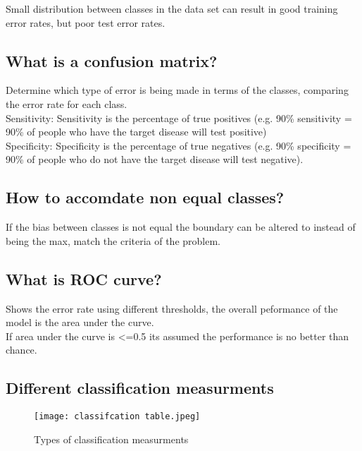 \documentclass[11pt]{scrartcl} %
\begin{document}
Small distribution between classes in the data set can result in good training error rates, but 
poor test error rates.

\subsection{What is a confusion matrix?}

Determine which type of error is being made in terms of the classes, comparing the error rate for
each class.\\

Sensitivity: Sensitivity is the percentage of true positives (e.g. 90\% sensitivity = 90\% of people who have the target disease will test positive)\\
Specificity: Specificity is the percentage of true negatives (e.g. 90\% specificity = 90\% of people who do not have the target disease will test negative).

\subsection{How to accomdate non equal classes?}

If the bias between classes is not equal the boundary can be altered to instead of being the max,
match the criteria of the problem.

\subsection{What is ROC curve?}

Shows the error rate using different thresholds, the overall peformance of the model is the
area under the curve.\\

If area under the curve is <=0.5 its assumed the performance is no better than chance.

\subsection{Different classification measurments}

\begin{figure}[h] %
	\centering
	\texttt{[image: classifcation table.jpeg]} %
	\caption{Types of classification measurments}
\end{figure}
\end{document}
